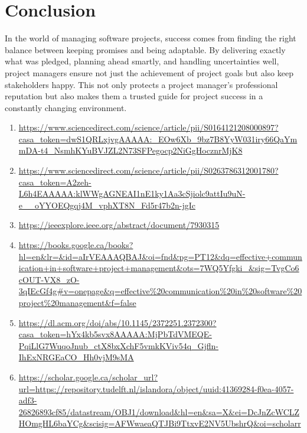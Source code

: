 \documentclass[12pt]{article}
\begin{document}
\section{Conclusion }
In the world of managing software projects, success comes from finding the right balance between keeping promises and being adaptable. By delivering exactly what was pledged, planning ahead smartly, and handling uncertainties well, project managers ensure not just the achievement of project goals but also keep stakeholders happy. This not only protects a project manager's professional reputation but also makes them a trusted guide for project success in a constantly changing environment.
\newpage
\begin{thebibliography}

\begin{enumerate}

    \item \footnotesize\url{https://www.sciencedirect.com/science/article/pii/S0164121208000897?casa_token=dwS1QRLxjvgAAAAA:_EOw6Xb_9bz7B8YyW031iry66QaYmmDA-t4_NsmhKYuBVJZL2N73SFPegocp2NiGgHocznrMjK8}
    
    \item \footnotesize\url{https://www.sciencedirect.com/science/article/pii/S0263786312001780?casa_token=A2zeh-L6h4EAAAAA:klWWgAGNEAI1nE1ky1Aa3cSjiolc9attIu9uN-e__oYYOEQgqj4M_vphXT8N_Fd5r47b2n-jgIc}

    \item \footnotesize\url{https://ieeexplore.ieee.org/abstract/document/7930315}
    
    \item \footnotesize\url{https://books.google.ca/books?hl=en&lr=&id=aIrVEAAAQBAJ&oi=fnd&pg=PT12&dq=effective+communication+in+software+project+management&ots=7WQ5Yfgki_&sig=TvgCo6cOUT-VX8_zO-3qIEcGf4g#v=onepage&q=effective%20communication%20in%20software%20project%20management&f=false}
    
    \item \footnotesize\url{https://dl.acm.org/doi/abs/10.1145/2372251.2372300?casa_token=hYx4kb5svx8AAAAA:MjPbTdVMEQE-PqiLlG7WuqoJnub_ctX8bxXchF5vmkKViv54q_Gjfln-IhExNRGEaCO_Hh0vjM9sMA}
    
    \item \footnotesize\url{https://scholar.google.ca/scholar_url?url=https://repository.tudelft.nl/islandora/object/uuid:41369284-f0ea-4057-adf3-26826893cf85/datastream/OBJ1/download&hl=en&sa=X&ei=DcJnZcWCLZHOmgHL6baYCg&scisig=AFWwaeaQTJBi9TtxvE2NV5UbshrQ&oi=scholarr}
    

\end{enumerate}
\end{thebibliography}
\end{document}
